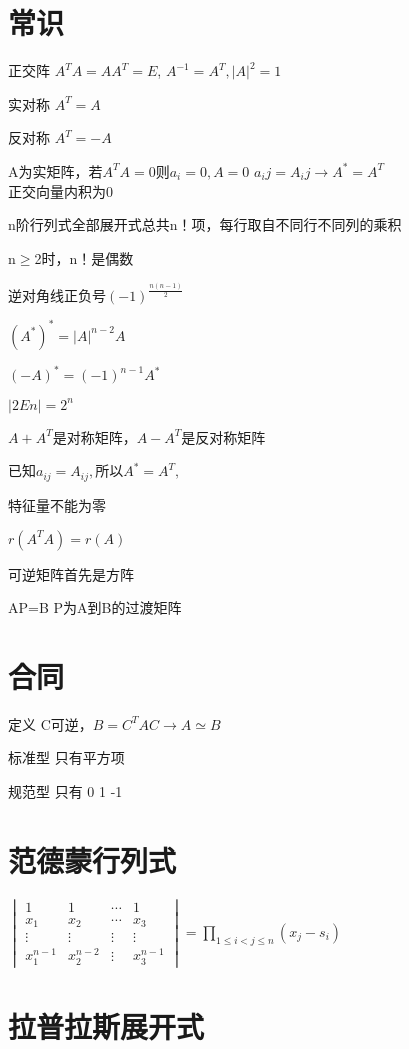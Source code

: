 \documentclass[UTF8]{ctexart}
\begin{document}
\section{常识}

正交阵 $A^{T}A=AA^{T}=E$, $A^{-1}=A^{T} , |A|^2 =1$


实对称 $A^{T}=A$

反对称 $A^{T}=-A$

A为实矩阵，若$A^{T}A=0\text{则}$$a_{i}=0,A=0$
$a_ij=A_ij \rightarrow A^*=A^T$ \\

正交向量内积为0

n阶行列式全部展开式总共n！项，每行取自不同行不同列的乘积

n$\geq$2时，n！是偶数

逆对角线正负号$(-1)^{\frac{n(n-1)}{2}}$

$(A^{*})^{*}=|A|^{n-2}A$

$(-A)^*=(-1)^{n-1} A^*$

$|2En|=2^n$


$A+A^{T}$是对称矩阵，$A-A^{T}$是反对称矩阵

已知$a_{ij}=A_{ij} , \mbox{所以} A^* =A^T ,$

特征量不能为零

$r(A^TA)=r(A)$

可逆矩阵首先是方阵

AP=B P为A到B的过渡矩阵

\section{合同}

定义 C可逆，$B=C^{T}AC  \rightarrow A\simeq B$

标准型 只有平方项

规范型 只有 0 1 -1

\section{范德蒙行列式}

$\begin{vmatrix}1 & 1 & \cdots & 1\\
x_{1} & x_{2} & \cdots & x_{3}\\
\vdots & \vdots & \vdots & \vdots\\
x_{1}^{n-1} & x_{2}^{n-2} & \vdots & x_{3}^{n-1}
\end{vmatrix}=\prod_{1\leq i<j\leq n}(x_{j}-s_{i})$

\section{拉普拉斯展开式}
\end{document}
